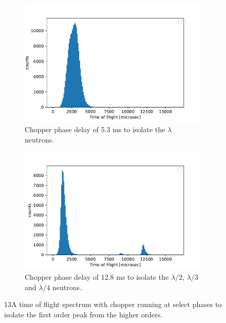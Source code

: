 {\begin{figure}
\centering
  \begin{subfigure}[b]{0.49\textwidth}
    \includegraphics[width=\textwidth]{13A_5300microsec__neg25mm_300s.pdf}
    \caption{Chopper phase delay of 5.3 ms to isolate the $\lambda$ neutrons.}
    \label{fig:5.3ms}
  \end{subfigure}
  \hfill
  \begin{subfigure}[b]{0.49\textwidth}
    \includegraphics[width=\textwidth]{13A_12800_695.pdf}
    \caption{Chopper phase delay of 12.8 ms to isolate the $\lambda/2$, $\lambda/3$ and $\lambda/4$ neutrons.}
    \label{fig:12.8ms}
  \end{subfigure}
  \caption{13A time of flight spectrum with chopper running at select phases to isolate the first order peak from the higher orders.}
  \label{fig:chopp_run}
\end{figure}

}
